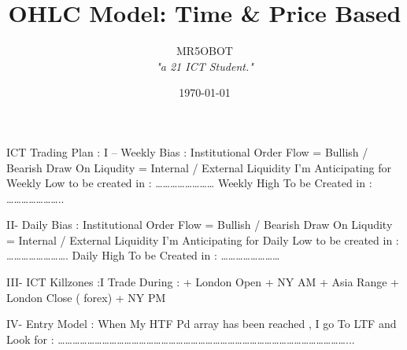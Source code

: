 \documentclass{article}
\title{OHLC Model: Time \& Price Based}
\author{MR5OBOT \\ \textit{"a 21 ICT Student."}}
\date{\today}
\begin{document}
\maketitle
\pagestyle{fancy}

\vspace{0.5cm}

\noindent\hdashrule[0.1ex]{\linewidth}{0.1pt}{2mm} 

ICT Trading Plan :
I – Weekly Bias :
Institutional Order Flow = Bullish / Bearish
Draw On Liqudity = Internal / External Liquidity
I’m Anticipating for Weekly Low to be created in : ……………………
Weekly High To be Created in : …………………..


II- Daily Bias :
Institutional Order Flow = Bullish / Bearish
Draw On Liqudity = Internal / External Liquidity
I’m Anticipating for
Daily Low to be created in : …………………….
Daily High To be Created in : ……………………

III- ICT Killzones :I Trade During : + London Open
+ NY AM
+ Asia Range
+ London Close ( forex)
+ NY PM


IV- Entry Model :
When My HTF Pd array has been reached , I go To LTF and Look for :
………………………………………………………………………………………………………...
\end{document}
